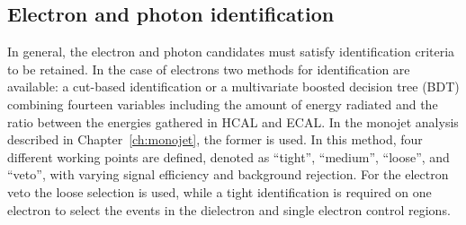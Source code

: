 \subsection{Electron and photon identification}
\label{sec:electron_ID}

In general, the electron and photon candidates must satisfy identification criteria to be retained. In the case of electrons two methods for identification are available: a cut-based identification or a multivariate boosted decision tree (BDT) combining fourteen variables including the amount of energy radiated and the ratio between the energies gathered in HCAL and ECAL. In the monojet analysis described in Chapter~\ref{ch:monojet}, the former is used. In this method, four different working points are defined, denoted as ``tight'', ``medium'', ``loose'', and ``veto'', with varying signal efficiency and background rejection. For the electron veto the loose selection is used, while a tight identification is required on one electron to select the events in the dielectron and single electron control regions.

